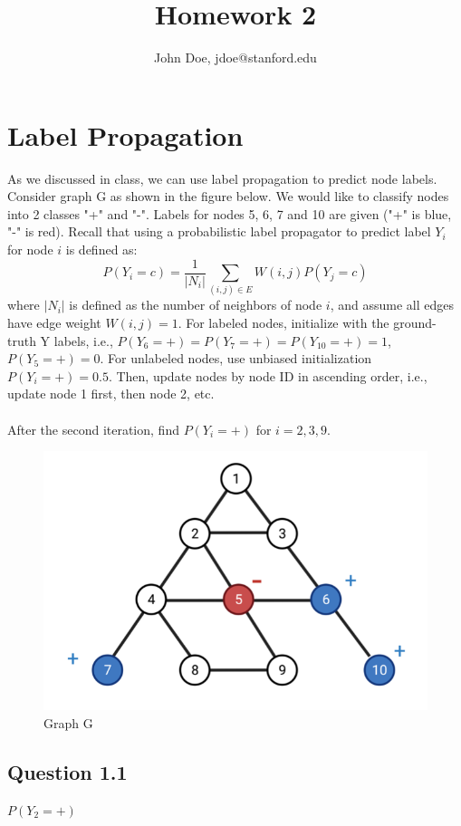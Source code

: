 \documentclass{article}
\title{Homework 2}
\author{John Doe, jdoe@stanford.edu}
\begin{document}
\maketitle

\section{Label Propagation}

As we discussed in class, we can use label propagation to predict node labels. Consider graph G as shown in the figure below. We would like to classify nodes into 2 classes "+" and "-". Labels for nodes 5, 6, 7 and 10 are given ("+" is blue, "-" is red). Recall that using a probabilistic label propagator to predict label $Y_i$ for node $i$ is defined as: $$P(Y_i = c) = \frac{1}{|N_i|} \sum_{(i,j) \in E} W(i,j) P(Y_j = c)$$ where $|N_i|$ is defined as the number of neighbors of node $i$, and assume all edges have edge weight $W(i,j) = 1$. For labeled nodes, initialize with the ground-truth Y labels, i.e., $P(Y_6 = +) = P(Y_7 = +) = P(Y_{10} = +) = 1$, $P(Y_5 = +) = 0$. For unlabeled nodes, use unbiased initialization $P(Y_i = +) = 0.5$. Then, update nodes by node ID in ascending order, i.e., update node 1 first, then node 2, etc. \\
\\
After the second iteration, find $P(Y_i = +)$ for $i = 2,3,9$.
\begin{figure}[!htb]
\centering
  \includegraphics[width=0.6\columnwidth]{label-propagation.png}
  \caption{Graph G}
\end{figure}

\subsection*{Question 1.1}
$P(Y_2 = +)$
\end{document}
